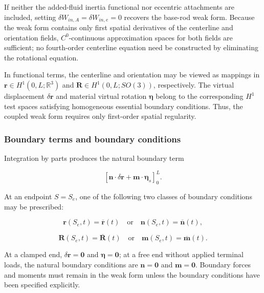 If neither the added-fluid inertia functional nor eccentric attachments are included, setting \(\delta W_{in,A} = \delta W_{in,e} = 0\) recovers the base-rod weak form. Because the weak form contains only first spatial derivatives of the centerline and orientation fields, \(C^{0}\)-continuous approximation spaces for both fields are sufficient; no fourth-order centerline equation need be constructed by eliminating the rotational equation.

In functional terms, the centerline and orientation may be viewed as mappings in \(\mathbf{r} \in H^{1}\left( 0,L;\mathbb{R}^{3} \right)\) and \(\mathbf{R} \in H^{1}\left( 0,L;SO(3) \right)\), respectively. The virtual displacement \(\delta\mathbf{r}\) and material virtual rotation \(\bm{\eta}\) belong to the corresponding \(H^{1}\) test spaces satisfying homogeneous essential boundary conditions. Thus, the coupled weak form requires only first-order spatial regularity.

\subsubsection{Boundary terms and boundary conditions}\label{sec:rod-1-5-5}

Integration by parts produces the natural boundary term

\begin{equation}
\label{eq:rod-1-92}
\left\lbrack \mathbf{n} \cdot \delta\mathbf{r} + \mathbf{m} \cdot \bm{\eta}_{s} \right\rbrack_{0}^{L}.
\end{equation}

At an endpoint \(S = S_{e}\), one of the following two classes of boundary conditions may be prescribed:

\begin{equation}
\label{eq:rod-1-93}
\mathbf{r}\left( S_{e},t \right) = \overline{\mathbf{r}}(t)\quad\text{or}\quad\mathbf{n}\left( S_{e},t \right) = \overline{\mathbf{n}}(t),
\end{equation}

\begin{equation}
\label{eq:rod-1-94}
\mathbf{R}\left( S_{e},t \right) = \overline{\mathbf{R}}(t)\quad\text{or}\quad\mathbf{m}\left( S_{e},t \right) = \overline{\mathbf{m}}(t).
\end{equation}

At a clamped end, \(\delta\mathbf{r} = \mathbf{0}\) and \(\bm{\eta} = \mathbf{0}\); at a free end without applied terminal loads, the natural boundary conditions are \(\mathbf{n} = \mathbf{0}\) and \(\mathbf{m} = \mathbf{0}\). Boundary forces and moments must remain in the weak form unless the boundary conditions have been specified explicitly.

